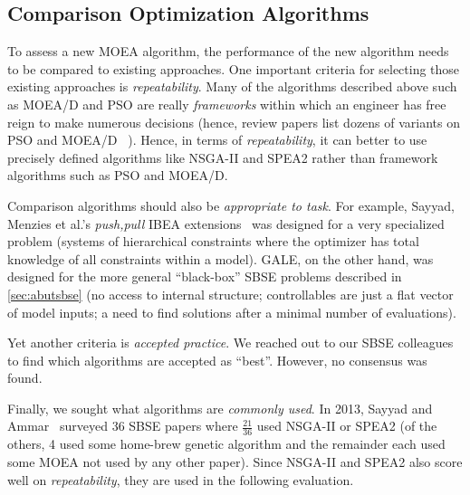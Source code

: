 \documentclass[10pt,journal,compsoc]{IEEEtran}
\newcommand{\tion}[1]{\textsection\ref{sec:#1}}
\newenvironment{changed}{\par\color{MyDarkBlue}}{\par}
\begin{document}
\subsection{Comparison Optimization Algorithms}\label{sec:compares}
\begin{changed}
To  assess a new MOEA algorithm, the performance of the new algorithm needs
to be compared to existing approaches.
One important criteria for selecting those existing approaches is
 {\em repeatability}. 
Many of the algorithms described above such as MOEA/D and PSO
are really {\em frameworks} within which an engineer has free reign to make numerous decisions
(hence, 
review papers list dozens of variants on  PSO and MOEA/D ~\cite{V.Sedenka2010,5601760}).
Hence, in terms of {\em repeatability}, it can better to use precisely defined algorithms like NSGA-II
and SPEA2 rather than framework algorithms such as PSO and MOEA/D.


Comparison algorithms should also be
{\em appropriate to task}.  For example,
Sayyad, Menzies et al.'s {\em push,pull} IBEA
extensions~\cite{sayyad13a,sayyad13b} was designed
for a very specialized problem (systems of
hierarchical constraints where the optimizer has
total knowledge of all constraints within a model).
GALE, on the other hand, was designed for the more
general ``black-box'' SBSE problems described in
\tion{abutsbse} (no access to internal structure;
controllables are just a flat vector of model
inputs; a need to find solutions after a minimal
number of evaluations).

Yet another criteria is {\em accepted practice}. We reached out to our SBSE colleagues to
 find
which algorithms are accepted as ``best''.  However, no consensus was found.

Finally, we sought  what algorithms are {\em commonly used}.
In 2013, Sayyad and Ammar~\cite{sayyad13c} surveyed 36 SBSE papers where $\frac{21}{36}$
used NSGA-II or SPEA2 (of the others, 4 used some home-brew genetic algorithm and the remainder
each used some MOEA not used by any other paper). Since NSGA-II and SPEA2 
also score well on {\em repeatability},
they are used in the following evaluation.
\end{changed}
\end{document}
